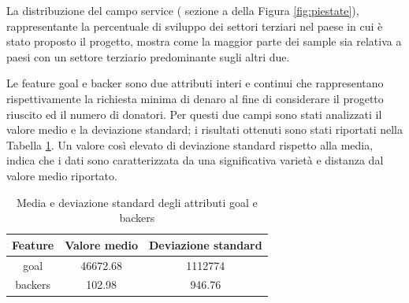 \begin{figure}%
	\centering
	\qquad
	\caption{}%
	\label{fig:piecategory}%
\end{figure}

La distribuzione del campo service ( sezione a della Figura \ref{fig:piestate}), rappresentante la percentuale di sviluppo dei settori terziari nel paese in cui è stato proposto il progetto, mostra come la maggior parte dei sample sia relativa a paesi con un settore terziario predominante sugli altri due.   


Le feature goal e backer sono due attributi interi e continui che rappresentano rispettivamente la richiesta minima di denaro al fine di considerare il progetto riuscito ed il numero di donatori. Per questi due campi sono stati analizzati il valore medio e la deviazione standard; i risultati ottenuti sono stati riportati nella Tabella \ref{tab:meansdgoalbackers}. Un valore così elevato di deviazione standard rispetto alla media, indica che i dati sono caratterizzata da una significativa varietà e distanza dal valore medio riportato.
\begin{table}
	\centering
	\label{tab:meansdgoalbackers}
	\caption{Media e deviazione standard degli attributi goal e backers}
	\begin{tabular}{|c|c|c|}
		\hline 
		\textbf{Feature} & \textbf{Valore medio} & \textbf{Deviazione standard} \\ 
		\hline 
		goal & 46672.68 & 1112774 \\ 
		\hline 
		backers & 102.98 & 946.76 \\ 
		\hline 
	\end{tabular} 
\end{table}


